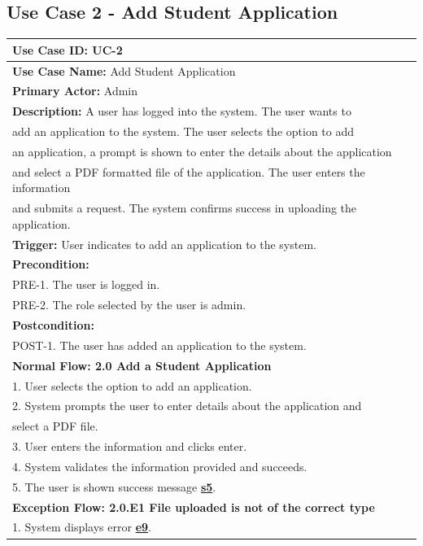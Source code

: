 \documentclass[fontsize=12pt,paper=letter,twoside]{scrartcl}
\begin{document}
\subsection{Use Case 2 - Add Student Application} \label{subsec:uc2}
\begin{table}[!htb]
\begin{center}
\begin{tabular}{|l|l|}
\hline
\textbf{Use Case ID:} UC-2 \\ \hline
\textbf{Use Case Name:} Add Student Application \\ \hline
\textbf {Primary Actor:} Admin \\ \hline
\textbf{Description:} A user has logged into the system. The user wants to \\add an application to the system. The user selects the option to add \\an application, a prompt is shown to enter the details about the application \\and select a PDF formatted file of the application. The user enters the information \\and submits a request. The system confirms success in uploading the application.\\ \hline
\textbf{Trigger:} User indicates to add an application to the system.\\ \hline
\textbf{Precondition:}
\\ PRE-1. The user is logged in. 
\\ PRE-2. The role selected by the user is admin. \\ \hline
\textbf{Postcondition:}
\\ POST-1. The user has added an application to the system. \\ \hline
\textbf{Normal Flow: 2.0 Add a Student Application}
\\ 1. User selects the option to add an application.
\\ 2. System prompts the user to enter details about the application and \\select a PDF file.
\\ 3. User enters the information and clicks enter.
\\ 4. System validates the information provided and succeeds.
\\ 5. The user is shown success message \hyperref[app:success]{\textbf{s5}}.
\\ \hline
\textbf{Exception Flow: 2.0.E1 File uploaded is not of the correct type}
\\ 1. System displays error \hyperref[app:error]{\textbf{e9}}.

\end{tabular}
\end{center}
\end{table}
\end{document}
